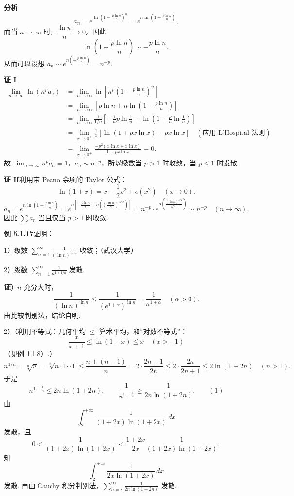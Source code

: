 \documentclass[UTF8, 12pt, fontset=fandol, oneside]{ctexart}
\begin{document}
\noindent\textbf{分析}\quad
\[
  a_n=e^{\ln\left(1-\frac{p\ln n}{n}\right)^n}
  =e^{n\ln\left(1-\frac{p\ln n}{n}\right)},
\]
而当 $n\to\infty$ 时，$\dfrac{\ln n}{n}\to0$，因此
\[
  \ln\left(1-\frac{p\ln n}{n}\right)\sim-\frac{p\ln n}{n},
\]
从而可以设想 $a_n\sim e^{n\left(-\frac{p\ln n}{n}\right)}=n^{-p}$.

\noindent\textbf{证 I}\quad
\[
\begin{aligned}
\lim_{n\to\infty}\ln(n^p a_n)
&=\lim_{n\to\infty}\ln\left[n^p\left(1-\frac{p\ln n}{n}\right)^n\right]\\
&=\lim_{n\to\infty}\left[p\ln n+n\ln\left(1-\frac{p\ln n}{n}\right)\right]\\
&=\lim_{n\to\infty}\frac1{1/n}\left[-\frac1n p\ln\frac1n+\ln\left(1+\frac pn\ln\frac1n\right)\right]\\
&=\lim_{x\to0^+}\frac1x[\ln(1+px\ln x)-px\ln x]\quad(\text{应用 L'Hospital 法则})\\
&=\lim_{x\to0^+}\frac{-p^2(x\ln x+x\ln x)}{1+px\ln x}=0.
\end{aligned}
\]
故 $\displaystyle\lim_{n\to\infty}n^p a_n=1$，$a_n\sim n^{-p}$，所以级数当 $p>1$ 时收敛，当 $p\le1$ 时发散.

\noindent\textbf{证 II}\quad 利用带 Peano 余项的 Taylor 公式：
\[
  \ln(1+x)=x-\frac12x^2+o(x^2)\quad(x\to0).
\]
\[
  a_n=e^{n\ln\left(1-\frac{p\ln n}{n}\right)}
  =e^{n\left[-\frac{p\ln n}{n}+o\left(\left(\frac{\ln n}{n}\right)^{3/2}\right)\right]}
  =n^{-p}\cdot e^{o\left(\frac{(\ln n)^{3/2}}{n^{1/2}}\right)}
  \sim n^{-p}\quad(n\to\infty),
\]
因此 $\sum a_n$ 当且仅当 $p>1$ 时收敛.

\noindent\textbf{例 5.1.17}\quad 证明：

1）级数 $\displaystyle\sum_{n=1}^\infty \frac1{(\ln n)^{\ln n}}$ 收敛；（武汉大学）

2）级数 $\displaystyle\sum_{n=1}^\infty \frac1{n^{1+1/n}}$ 发散.

\noindent\textbf{证}）$n$ 充分大时，
\[
  \frac1{(\ln n)^{\ln n}}\le
  \frac1{(e^{1+\alpha})^{\ln n}}=\frac1{n^{1+\alpha}}\quad(\alpha>0).
\]
由比较判别法，结论自明.

2）（利用不等式：几何平均 $\le$ 算术平均，和“对数不等式”：
\[
  \frac{x}{x+1}\le\ln(1+x)\le x\quad(x>-1)
\]
（见例 1.1.8）.）
\[
  n^{1/n}=\sqrt[n]{n}=\sqrt[n]{n\cdot1\cdots1}
  \le \frac{n+(n-1)}n=2\cdot\frac{2n-1}{2n}
  \le2\cdot\frac{2n}{2n+1}\le2\ln(1+2n)\quad(n>1).
\]
于是
\[
  n^{1+\frac1n}\le2n\ln(1+2n),
\qquad
  \frac1{n^{1+\frac1n}}\ge\frac1{2n\ln(1+2n)}.
\qquad(1)
\]
由
\[
  \int_2^{+\infty}\frac1{(1+2x)\ln(1+2x)}\,dx
\]
发散，且
\[
  0<\frac1{(1+2x)\ln(1+2x)}
  <\frac{1+2x}{2x}\frac1{(1+2x)\ln(1+2x)},
\]
知
\[
  \int_2^{+\infty}\frac1{2x\ln(1+2x)}\,dx
\]
发散. 再由 Cauchy 积分判别法，$\displaystyle\sum_{n=2}^\infty\frac1{2n\ln(1+2n)}$ 发散.
\end{document}

